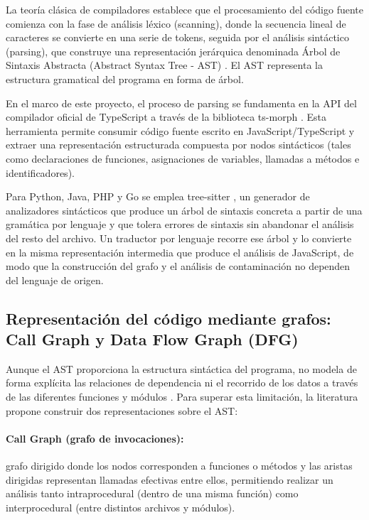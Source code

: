 La teoría clásica de compiladores establece que el procesamiento del código fuente comienza con la fase de análisis léxico (scanning), donde la secuencia lineal de caracteres se convierte en una serie de tokens, seguida por el análisis sintáctico (parsing), que construye una representación jerárquica denominada Árbol de Sintaxis Abstracta (Abstract Syntax Tree - AST) \citep{aho2006}. El AST representa la estructura gramatical del programa en forma de árbol.

En el marco de este proyecto, el proceso de parsing se fundamenta en la API del compilador oficial de TypeScript a través de la biblioteca ts-morph \citep{tsmorph}. Esta herramienta permite consumir código fuente escrito en JavaScript/TypeScript y extraer una representación estructurada compuesta por nodos sintácticos (tales como declaraciones de funciones, asignaciones de variables, llamadas a métodos e identificadores).

Para Python, Java, PHP y Go se emplea tree-sitter \citep{treesitter}, un generador de analizadores sintácticos que produce un árbol de sintaxis concreta a partir de una gramática por lenguaje y que tolera errores de sintaxis sin abandonar el análisis del resto del archivo. Un traductor por lenguaje recorre ese árbol y lo convierte en la misma representación intermedia que produce el análisis de JavaScript, de modo que la construcción del grafo y el análisis de contaminación no dependen del lenguaje de origen.

\subsection{Representación del código mediante grafos: Call Graph y Data Flow Graph (DFG)}\label{sec:n3.2.3}

Aunque el AST proporciona la estructura sintáctica del programa, no modela de forma explícita las relaciones de dependencia ni el recorrido de los datos a través de las diferentes funciones y módulos \citep{yamaguchi2014}. Para superar esta limitación, la literatura propone construir dos representaciones sobre el AST:

\paragraph{Call Graph (grafo de invocaciones):} grafo dirigido donde los nodos corresponden a funciones o métodos y las aristas dirigidas representan llamadas efectivas entre ellos, permitiendo realizar un análisis tanto intraprocedural (dentro de una misma función) como interprocedural (entre distintos archivos y módulos).

